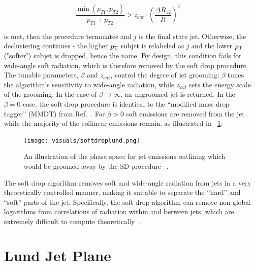 \begin{equation}
  \frac{\min(p_{T1},p_{T2})}{p_{T1}+p_{T2}} > z_{cut} \cdot (\frac{\Delta R_{12}}{R})^\beta
\end{equation}

is met, then the procedure terminates and $j$ is the final state jet. Otherwise, the declustering continues - 
the higher $p_{\mathrm{T}}$ subjet is relabeled as $j$ and the lower $p_{\mathrm{T}}$ ("softer") subjet is dropped, hence the name.
By design, this condition fails for wide-angle soft radiation, which is therefore removed by the soft
drop procedure. The tunable parameters, $\beta$ and $z_{cut}$, control the degree of jet grooming:
$\beta$ tunes the algorithm's sensitivity to wide-angle radiation, while $z_{cut}$ sets the energy scale
of the grooming. In the case of $\beta \rightarrow \infty$, an ungroomed jet is returned. 
In the $\beta = 0$ case, the soft drop procedure is identical to the ``modified mass drop tagger'' (MMDT)
from Ref.~\cite{mmdt}. For $\beta > 0$  soft emissions are removed from the jet while the majority of the collinear emissions remain, as illustrated in ~\ref{fig:softdroplund}. 


\begin{figure}[htb]
\centering
\texttt{[image: visuals/softdroplund.png]}
\caption{An illustration of the phase space for jet emissions outlining which would be groomed away by the SD procedure ~\cite{softdrop}.}
\label{fig:softdroplund}
\end{figure}

The soft drop algorithm removes soft and wide-angle radiation
from jets in a very theoretically controlled manner, making it suitable to separate
the ``hard'' and ``soft'' parts of the jet. Specifically, the soft drop
algorithm can remove non-global logarithms from correlations of
radiation within and between jets, which are extremely difficult to
compute theoretically~\cite{Dasgupta:2001sh,mmdt,softdrop,Dasgupta:2013via,Dasgupta:2015yua,Larkoski:2015zka}.













\section{Lund Jet Plane}\label{sec:lundjetplane}



